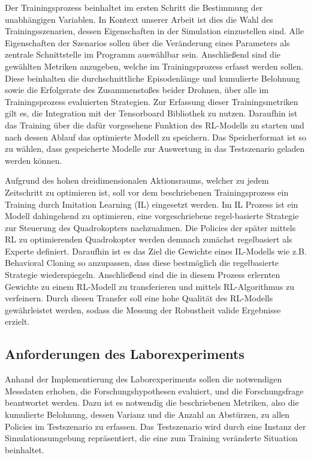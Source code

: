 Der Trainingsprozess beinhaltet im ersten Schritt die Bestimmung der unabhängigen Variablen. 
In Kontext unserer Arbeit ist dies die Wahl des Trainingsszenarien, dessen Eigenschaften in der Simulation einzustellen sind.
Alle Eigenschaften der Szenarios sollen über die Veränderung eines Parameters als zentrale Schnittstelle im Programm auswählbar sein.
Anschließend sind die gewählten Metriken anzugeben, welche im Trainingsprozess erfasst werden sollen.
Diese beinhalten die durchschnittliche Episodenlänge und kumulierte Belohnung sowie die Erfolgsrate des Zusammenstoßes beider Drohnen, über alle im Trainingsprozess evaluierten Strategien.
Zur Erfassung dieser Trainingsmetriken gilt es, die Integration mit der Tensorboard Bibliothek zu nutzen.
Daraufhin ist das Training über die dafür vorgesehene Funktion des RL-Modells zu starten und nach dessen Ablauf das optimierte Modell zu speichern.
Das Speicherformat ist so zu wählen, dass gespeicherte Modelle zur Auswertung in das Testszenario geladen werden können.

Aufgrund des hohen dreidimensionalen Aktionsraums, welcher zu jedem Zeitschritt zu optimieren ist, soll vor dem beschriebenen Trainingsprozess ein Training durch Imitation Learning (IL) eingesetzt werden.
Im IL Prozess ist ein Modell dahingehend zu optimieren, eine vorgeschriebene regel-basierte Strategie zur Steuerung des Quadrokopters nachzuahmen. 
Die Policies der später mittels RL zu optimierenden Quadrokopter werden demnach zunächst regelbasiert als Experte definiert. 
Daraufhin ist es das Ziel die Gewichte eines IL-Modells wie z.B. Behavioral Cloning so anzupassen, dass diese bestmöglich die regelbasierte Strategie wiederspiegeln.
Anschließend sind die in diesem Prozess erlernten Gewichte zu einem RL-Modell zu transferieren und mittels RL-Algorithmus zu verfeinern.
Durch diesen Transfer soll eine hohe Qualität des RL-Modells gewährleistet werden, sodass die Messung der Robustheit valide Ergebnisse erzielt.

\subsection{Anforderungen des Laborexperiments}

Anhand der Implementierung des Laborexperiments sollen die notwendigen Messdaten erhoben, die Forschungshypothesen evaluiert, und die Forschungsfrage beantwortet werden.
Dazu ist es notwendig die beschriebenen Metriken, also die kumulierte Belohnung, dessen Varianz und die Anzahl an Abstürzen, zu allen Policies im Testszenario zu erfassen.
Das Testszenario wird durch eine Instanz der Simulationsumgebung repräsentiert, die eine zum Training veränderte Situation beinhaltet.

